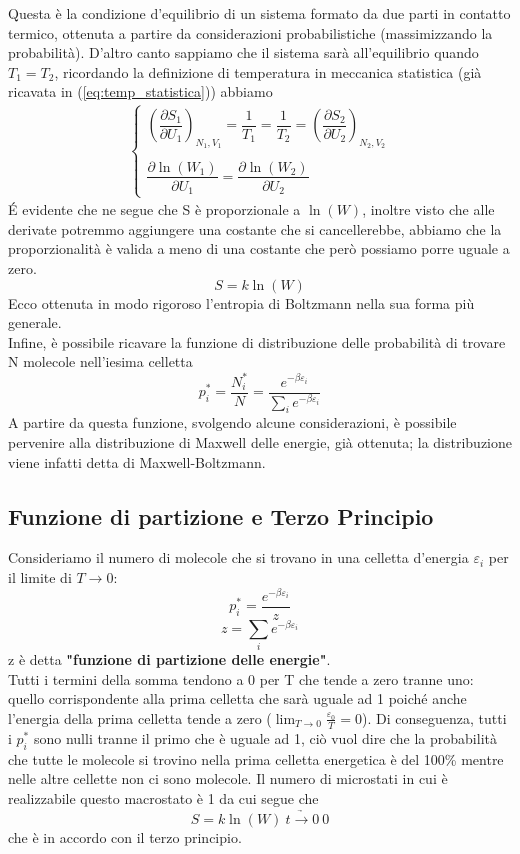 \documentclass[
10pt, %
a4paper, %
oneside, %
headinclude,footinclude, %
BCOR5mm, %
]{scrartcl}
\begin{document}
Questa è la condizione d'equilibrio di un sistema formato da due parti in contatto termico, ottenuta a partire da considerazioni probabilistiche (massimizzando la probabilità). D'altro canto sappiamo che il sistema sarà all'equilibrio quando \(T_1 = T_2\), ricordando la definizione di temperatura in meccanica statistica (già ricavata in (\ref{eq:temp_statistica})) abbiamo 
\begin{align*}
	\begin{cases}
		\left(\dfrac{\partial S_1}{\partial U_1}\right)_{N_1, V_1} = \dfrac{1}{T_1} = \dfrac{1}{T_2} = \left(\dfrac{\partial S_2}{\partial U_2}\right)_{N_2, V_2}\\\\
		\dfrac{\partial \ln(W_1)}{\partial U_1} = \dfrac{\partial \ln(W_2)}{\partial U_2}
	\end{cases}
\end{align*}
\'{E} evidente che ne segue che S è proporzionale a \(\ln(W)\), inoltre visto che alle derivate potremmo aggiungere una costante che si cancellerebbe, abbiamo che la proporzionalità è valida a meno di una costante che però possiamo porre uguale a zero.
\[S = k\ln(W)\] 
Ecco ottenuta in modo rigoroso l'entropia di Boltzmann nella sua forma più generale.\\
Infine, è possibile ricavare la funzione di distribuzione delle probabilità di trovare N molecole nell'iesima celletta 
\[p_i^*=\frac{N_i^*}{N}=\frac{e^{-\beta \varepsilon_i}}{\sum_i e^{-\beta \varepsilon_i}}\]
A partire da questa funzione, svolgendo alcune considerazioni, è possibile pervenire alla distribuzione di Maxwell delle energie, già ottenuta; la distribuzione viene infatti detta di Maxwell-Boltzmann.
\subsection{Funzione di partizione e Terzo Principio}
Consideriamo il numero di molecole che si trovano in una celletta d'energia $\varepsilon_i$ per il limite di \(T\to 0\):
\[p_i^*= \frac{e^{-\beta \varepsilon_i}}{z}\]
\[z=\sum_ie^{-\beta \varepsilon_i}\]
z è detta \textbf{"funzione di partizione delle energie"}.\\
Tutti i termini della somma tendono a 0 per T che tende a zero tranne uno: quello corrispondente alla prima celletta che sarà uguale ad 1 poiché anche l'energia della prima celletta tende a zero ($\lim_{T\to 0}\frac{\varepsilon_0}{T}=0$). Di conseguenza, tutti i \(p_i^*\) sono nulli tranne il primo che è uguale ad 1, ciò vuol dire che la probabilità che tutte le molecole si trovino nella prima celletta energetica è del 100\% mentre nelle altre cellette non ci sono molecole. Il numero di microstati in cui è realizzabile questo macrostato è 1 da cui segue che 
\[S=k\ln(W)\ \underrightarrow{t\to0}\ 0\]
che è in accordo con il terzo principio. 
\end{document}
